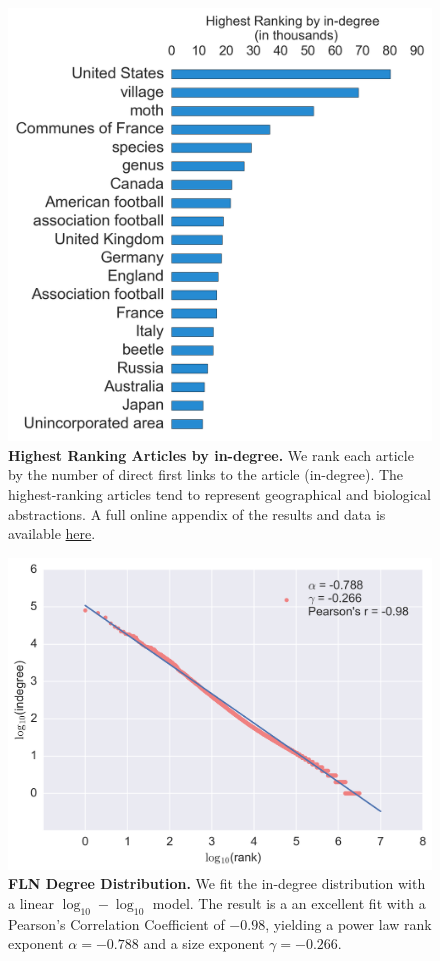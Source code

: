 \begin{figure}[tp!]
  \includegraphics[width=\columnwidth]{graphics/articles_ndegree.png}
  \caption{
    \textbf{Highest Ranking Articles by in-degree.}
    We rank each article by the number of direct first links to the article (in-degree). The highest-ranking articles tend to represent geographical and biological abstractions. A full online appendix of the results and data is available \href{http://compstorylab.org/share/papers/ibrahim2016a/index.html}{here}.}
  \label{fig:indegree list}
\end{figure}
\begin{figure}[tp!]
  \includegraphics[width=\columnwidth]{graphics/ndegree_loglog.png}
  \caption{
    \textbf{FLN Degree Distribution.}
We fit the in-degree distribution with a linear $\log_{10}-\log_{10}$ model. 
The result is a 
an excellent fit with a Pearson's Correlation Coefficient of $-0.98$, yielding a 
power law rank exponent $\alpha = -0.788$ and a size exponent $\gamma = -0.266$. 
}
  \label{fig:degree distribution}
\end{figure}

